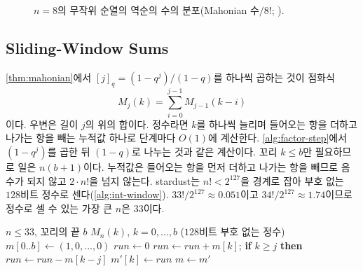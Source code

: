 \begin{figure}[htbp]
\centering
{}
\caption{$n=8$의 무작위 순열의 역순의 수의 분포(Mahonian 수$/8!$; ).}
\label{fig:mahonian-dist}
\end{figure}

\subsection{Sliding-Window Sums}

\cref{thm:mahonian}에서 $[j]_q=(1-q^j)/(1-q)$를 하나씩 곱하는 것이 점화식
\[
M_j(k)=\sum_{i=0}^{j-1}M_{j-1}(k-i)
\]
이다. 우변은 길이 $j$의  위의 합이다. 정수라면 $k$를 하나씩 늘리며 들어오는 항을 더하고 나가는 항을 빼는 누적값 하나로 단계마다 $O(1)$에 계산한다. \cref{alg:factor-step}에서 $(1-q^j)$를 곱한 뒤 $(1-q)$로 나누는 것과 같은 계산이다. 꼬리 $k\le b$만 필요하므로 일은 $n(b+1)$이다. 누적값은 들어오는 항을 먼저 더하고 나가는 항을 빼므로 음수가 되지 않고 $2\cdot n!$을 넘지 않는다. stardust는 $n!<2^{127}$을 경계로 잡아 부호 없는 $128$비트 정수로 센다(\cref{alg:int-window}). $33!/2^{127}\approx0.051$이고 $34!/2^{127}\approx1.74$이므로 정수로 셀 수 있는 가장 큰 $n$은 $33$이다.

\begin{algorithm}[htbp]
\begin{algorithmic}[1]
\Require $n\le33$, 꼬리의 끝 $b$
\Ensure $M_n(k)$, $k=0,\dots,b$ ($128$비트 부호 없는 정수)
\State $m[0..b]\gets(1,0,\dots,0)$
  \State $\mathit{run}\gets0$
    \State $\mathit{run}\gets\mathit{run}+m[k]$; \textbf{if} $k\ge j$ \textbf{then} $\mathit{run}\gets\mathit{run}-m[k-j]$
    \State $m'[k]\gets\mathit{run}$ 
  \EndFor
  \State $m\gets m'$
\EndFor
\end{algorithmic}
\caption{정수의 미끄러지는 창 (stardust 의 )}
\label{alg:int-window}
\end{algorithm}

